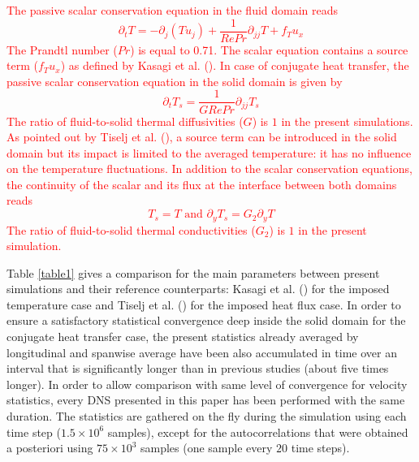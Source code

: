 \documentclass[review]{elsarticle}
\begin{document}
\textcolor{red}{The passive scalar conservation equation in the fluid domain reads
\begin{equation}
\partial_t T = - \partial_j \left( T u_j \right) + \frac{1}{Re Pr} \partial_{jj} T + f_T u_x
\end{equation}
The Prandtl number ($Pr$) is equal to 0.71.
The scalar equation contains a source term ($f_T u_x$) as defined by Kasagi et al. (\cite{kasagi1992direct}).
In case of conjugate heat transfer, the passive scalar conservation equation in the solid domain is given by
\begin{equation}
\partial_t T_s = \frac{1}{G Re Pr} \partial_{jj} T_s
\end{equation}
The ratio of fluid-to-solid thermal diffusivities ($G$) is $1$ in the present simulations.
As pointed out by Tiselj et al. (\cite{tiselj2013double}), a source term can be introduced in the solid domain but its impact is limited to the averaged temperature: it has no influence on the temperature fluctuations.
In addition to the scalar conservation equations, the continuity of the scalar and its flux at the interface between both domains reads
\begin{equation}
T_s=T \mbox{ and } \partial_y T_s = G_2 \partial_y T
\end{equation}
The ratio of fluid-to-solid thermal conductivities ($G_2$) is $1$ in the present simulation.}

Table \ref{table1} gives a comparison for the main parameters between present simulations and their reference counterparts: Kasagi et al. (\cite{kasagi1992direct}) for the imposed temperature case and Tiselj et al. (\cite{Tiselj2001dns}) for the imposed heat flux case.
In order to ensure a satisfactory statistical convergence deep inside the solid domain for the conjugate heat transfer case, the present statistics already averaged by longitudinal and spanwise average have been also accumulated in time over an interval that is significantly longer than in previous studies (about five times longer).
In order to allow comparison with same level of convergence for velocity statistics, every DNS presented in this paper has been performed with the same duration.
The statistics are gathered on the fly during the simulation using each time step ($1.5 \times 10^6$ samples), except for the autocorrelations that were obtained a posteriori using $75 \times 10^3$ samples (one sample every $20$ time steps).
\end{document}
